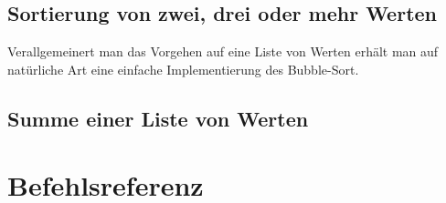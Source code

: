 \documentclass[11pt]{scrartcl}
\begin{document}



\subsection{Sortierung von zwei, drei oder mehr Werten}
\label{sec:example_sort}








Verallgemeinert man das Vorgehen auf eine Liste von Werten erhält man
auf natürliche Art eine einfache Implementierung des Bubble-Sort.
\subsection{Summe einer Liste von Werten}
\label{sec:example_sum_list}





\appendix
\newpage
\section{Befehlsreferenz}
\label{sec:instruction_reference}
\end{document}

